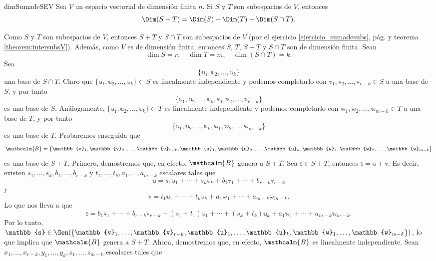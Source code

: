 \begin{theorem}{}{dimSumadeSEV}
    Sea $V$ un espacio vectorial de dimensión finita $n$. Si $S$ y $T$ son subespacios de $V$, entonces
    $$\Dim (S + T) = \Dim(S) + \Dim(T) - \Dim(S \cap T).$$

    \tcblower
    \demostracion Como $S$ y $T$ son subespacios de $V$, entonces $S + T$ y $S \cap T$ son subespacios de $V$ (por el ejercicio \ref{ejercicio_sumadesubs}, pág. \pageref{ejercicio_sumadesubs} y teorema \ref{theorem:intersubsV}). Además, como $V$ es de dimensión finita, entonces $S$, $T$, $S + T$ y $S \cap T$ son de dimensión finita. Sean
    $$\dim S = r, \quad \dim T = m, \quad \dim (S \cap T) = k.$$
    Sea
    $$\{\mathbb{u}_1, \mathbb{u}_2, \dots, \mathbb{u}_k\}$$
    una base de $S \cap T$. Claro que $\{\mathbb{u}_1, \mathbb{u}_2, \dots, \mathbb{u}_k\} \subset S$ es linealmente independiente y podemos completarlo con $\mathbb{v}_1, \mathbb{v}_2, \dots, \mathbb{v}_{r-k} \in S$ a una base de $S$, y por tanto
    $$\{\mathbb{u}_1, \mathbb{u}_2, \dots, \mathbb{u}_k, \mathbb{v}_1, \mathbb{v}_2, \dots, \mathbb{v}_{r-k}\}$$
    es una base de $S$. Análogamente, $\{\mathbb{u}_1, \mathbb{u}_2, \dots, \mathbb{u}_k\} \subset T$ es linealmente independiente y podemos completarlo con $\mathbb{w}_1, \mathbb{w}_2, \dots, \mathbb{w}_{m-k} \in T$ a una base de $T$, y por tanto
    $$\{\mathbb{u}_1, \mathbb{u}_2, \dots, \mathbb{u}_k, \mathbb{w}_1, \mathbb{w}_2, \dots, \mathbb{w}_{m-k}\}$$
    es una base de $T$. Probaremos enseguida que
    $$\mathcalm{B} = \{\mathbb{v}_1, \mathbb{v}_2, \dots, \mathbb{v}_{r-k}, \mathbb{u}_1, \mathbb{u}_2, \dots, \mathbb{u}_k, \mathbb{w}_1, \mathbb{w}_2, \dots, \mathbb{w}_{m-k}\}$$
    es una base de $S + T$. Primero, demostremos que, en efecto, $\mathcalm{B}$ genera a $S + T$. Sea $\mathbb{s} \in S + T$, entonces $\mathbb{s} = \mathbb{u} + \mathbb{v}$. Es decir, existen $s_1, \dots, s_k, b_1, \dots, b_{r-k}$ y $t_1, \dots, t_k, a_1, \dots, a_{m-k}$ escalares tales que
    $$\mathbb{u} = s_1 \mathbb{u}_1 + \cdots + s_k \mathbb{u}_k + b_1 \mathbb{v}_1 + \cdots + b_{r-k} \mathbb{v}_{r-k}$$
    y
    $$\mathbb{v} = t_1 \mathbb{u}_1 + \cdots + t_k \mathbb{u}_k + a_1 \mathbb{w}_1 + \cdots + a_{m-k} \mathbb{w}_{m-k}.$$
    Lo que nos lleva a que
    $$\mathbb{s} = b_1 \mathbb{v}_1 + \cdots + b_{r-k} \mathbb{v}_{r-k} + (s_1 + t_1)\mathbb{u}_1 + \cdots + (s_k + t_k)\mathbb{u}_k + a_1 \mathbb{w}_1 + \cdots + a_{m-k} \mathbb{w}_{m-k}.$$
    Por lo tanto, $\mathbb{s} \in \Gen (\{\mathbb{v}_1, \dots, \mathbb{v}_{r-k}, \mathbb{u}_1, \dots, \mathbb{u}_k, \mathbb{w}_1, \dots, \mathbb{w}_{m-k}\})$, lo que implica que $\mathcalm{B}$ genera a $S + T$. Ahora, demostremos que, en efecto, $\mathcalm{B}$ es linealmente independiente. Sean $x_1, \dots, x_{r-k}, y_1, \dots, y_k, z_1, \dots, z_{m-k}$ escalares tales que

\end{theorem}
